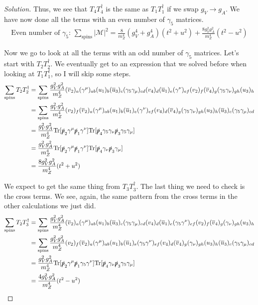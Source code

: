 \documentclass[12pt]{article}
\newenvironment{solution}{\begin{proof}[Solution]}{\end{proof}}
\begin{document}
\begin{solution}
Thus, we see that $T_4T_4^\dagger$ is the same as $T_1T_1^\dagger$ if we swap $g_V\rightarrow g_A$. We have now done all the terms with an even number of $\gamma_5$ matrices.
\begin{align*}
    \text{Even number of $\gamma_5$: }\sum_\text{spins}|\mathcal{M}|^2=\frac{8}{m_Z^4}(g_V^4+g_A^4)(t^2+u^2)+\frac{8g_V^2g_A^2}{m_Z^4}(t^2-u^2)
\end{align*} 

Now we go to look at all the terms with an odd number of $\gamma_5$ matrices. Let's start with $T_2T_2^\dagger$. We eventually get to an expression that we solved before when looking at $T_1T_1^\dagger$, so I will skip some steps.
\begin{align*}
    \sum_\text{spins}T_2T_2^\dagger&=\sum_\text{spins}\frac{g_V^2g_A^2}{m_Z^4}(\overline{v}_2)_a (\gamma^\mu)_{ab}(u_1)_b (\overline{u}_3)_c (\gamma_5\gamma_\mu)_{cd} (v_4)_d (\overline{u}_1)_e (\gamma^\nu)_{ef}(v_2)_f (\overline{v}_4)_g (\gamma_5\gamma_\nu)_{gh} (u_3)_h \\
    &=\sum_\text{spins}\frac{g_V^2g_A^2}{m_Z^4}(v_2)_f(\overline{v}_2)_a (\gamma^\mu)_{ab}(u_1)_b(\overline{u}_1)_e (\gamma^\nu)_{ef}(v_4)_d(\overline{v}_4)_g (\gamma_5\gamma_\nu)_{gh} (u_3)_h(\overline{u}_3)_c (\gamma_5\gamma_\mu)_{cd} \\
    &=\frac{g_V^2g_A^2}{m_Z^4}\text{Tr}[\slashed{p}_2\gamma^\mu\slashed{p}_1\gamma^\nu]\text{Tr}[\slashed{p}_4\gamma_5\gamma_\nu\slashed{p}_3\gamma_5\gamma_\mu] \\
    &= \frac{g_V^2g_A^2}{m_Z^4}\text{Tr}[\slashed{p}_2\gamma^\mu\slashed{p}_1\gamma^\nu]\text{Tr}[\slashed{p}_4\gamma_\nu\slashed{p}_3\gamma_\mu] \\
    &= \frac{8g_V^2g_A^2}{m_Z^4}(t^2+u^2)
\end{align*}

We expect to get the same thing from $T_3T_3^\dagger$. The last thing we need to check is the cross terms. We see, again, the same pattern from the cross terms in the other calculations we just did.
\begin{align*}
    \sum_\text{spins}T_2T_3^\dagger&=\sum_\text{spins}\frac{g_V^2g_A^2}{m_Z^4}(\overline{v}_2)_a (\gamma^\mu)_{ab}(u_1)_b (\overline{u}_3)_c (\gamma_5\gamma_\mu)_{cd} (v_4)_d (\overline{u}_1)_e (\gamma_5\gamma^\nu)_{ef}(v_2)_f (\overline{v}_4)_g (\gamma_\nu)_{gh} (u_3)_h \\
    &= \sum_\text{spins}\frac{g_V^2g_A^2}{m_Z^4}(v_2)_f(\overline{v}_2)_a (\gamma^\mu)_{ab}(u_1)_b(\overline{u}_1)_e (\gamma_5\gamma^\nu)_{ef}(v_4)_d(\overline{v}_4)_g (\gamma_\nu)_{gh} (u_3)_h(\overline{u}_3)_c (\gamma_5\gamma_\mu)_{cd} \\
    &= \frac{g_V^2g_A^2}{m_Z^4}\text{Tr}[\slashed{p}_2\gamma^\mu\slashed{p}_1\gamma_5\gamma^\nu]\text{Tr}[\slashed{p}_4\gamma_\nu\slashed{p}_3\gamma_5\gamma_\mu] \\
    &= \frac{4g_V^2g_A^2}{m_Z^4}(t^2-u^2)
\end{align*}


\end{solution}
\end{document}
